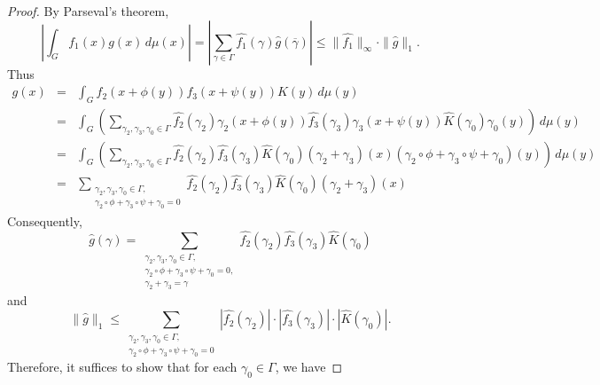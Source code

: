 \documentclass[10pt]{article}
\theoremstyle{definition}
\begin{document}
\begin{proof}
By Parseval's theorem,
\begin{equation*} %
\left| \int_G f_1(x) g(x) \, d\mu(x) \right|= \left| \sum_{\gamma \in \Gamma} \widehat{f_1}(\gamma) \widehat{g} (\overline{\gamma}) \right| \leq \| \widehat{f_1} \|_{\infty} \cdot \| \widehat{g} \|_1.
\end{equation*} 
Thus
\begin{eqnarray*}
g(x) &=& \int_{G} f_2(x+ \phi(y)) f_3(x+ \psi(y)) K(y) \, d\mu(y) \nonumber \\
&=& \int_G \left( \sum_{\gamma_2, \gamma_3, \gamma_0 \in \Gamma} \widehat{f_2}(\gamma_2) \gamma_2(x+ \phi(y)) \widehat{f_3}(\gamma_3) \gamma_3(x+ \psi(y)) \widehat{K}(\gamma_0) \gamma_0(y) \right) \, d\mu(y) \nonumber \\
&=& \int_G \left( \sum_{\gamma_2, \gamma_3, \gamma_0 \in \Gamma} \widehat{f_2}(\gamma_2) \widehat{f_3}(\gamma_3) \widehat{K}(\gamma_0) (\gamma_2 + \gamma_3)(x) (\gamma_2 \circ \phi +  \gamma_3 \circ \psi + \gamma_0 ) (y)\right) \, d\mu(y) \nonumber \\
&=&  \sum_{\substack{ \gamma_2, \gamma_3, \gamma_0 \in \Gamma,\\ \gamma_2 \circ \phi + \gamma_3 \circ \psi + \gamma_0=0}} \widehat{f_2}(\gamma_2) \widehat{f_3}(\gamma_3) \widehat{K}(\gamma_0) (\gamma_2 + \gamma_3)(x) %
\end{eqnarray*}
Consequently,
\begin{equation*} %
\widehat{g}(\gamma) = \sum_{\substack{ \gamma_2, \gamma_3, \gamma_0 \in \Gamma,\\ \gamma_2 \circ \phi + \gamma_3 \circ \psi + \gamma_0=0, \\ \gamma_2 + \gamma_3 = \gamma}} 
\widehat{f_2}(\gamma_2) \widehat{f_3}(\gamma_3) \widehat{K}(\gamma_0) 
\end{equation*}
and
\begin{equation*} %
\lVert \widehat{g} \rVert_1 \leq \sum_{\substack{ \gamma_2, \gamma_3, \gamma_0 \in \Gamma,\\ \gamma_2 \circ \phi + \gamma_3 \circ \psi + \gamma_0=0}} |\widehat{f_2}(\gamma_2) | \cdot | \widehat{f_3}(\gamma_3) | \cdot 
| \widehat{K}(\gamma_0) |.
\end{equation*}
Therefore, it suffices to show that for each $\gamma_0 \in \Gamma$, we have

\end{proof}
\end{document}
